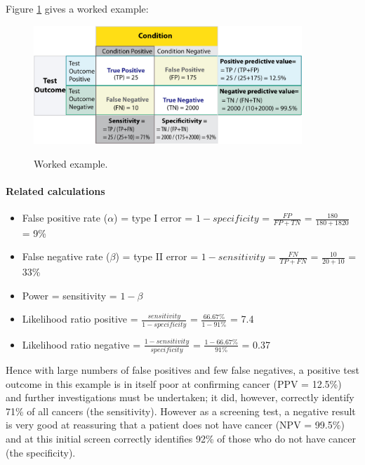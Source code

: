 Figure \ref{fig:sens_spec_example} gives a worked example:

\begin{figure}[ht]
  \centering
  \includegraphics[width=0.9\textwidth]{../Images/Sensitivity_Specificity_Example.jpg}\\
  \caption{Worked example.}\label{fig:sens_spec_example}
\end{figure}

\paragraph{Related calculations}

\begin{itemize}
  \item False positive rate ($\alpha$) = type I error = $1 - specificity$ = $\frac{FP}{FP + TN}$ = $\frac{180}{180+1820}$ = 9\%
  \item False negative rate ($\beta$) = type II error = $1 - sensitivity$ = $\frac{FN}{TP + FN}$ = $\frac{10}{20+10}$ = 33\%
  \item Power = sensitivity = $1 - \beta$
  \item Likelihood ratio positive = $\frac{sensitivity}{1−specificity}$ = $\frac{66.67\%}{1−91\%}$ = 7.4
  \item Likelihood ratio negative = $\frac{1−sensitivity}{specificity}$ = $\frac{1−66.67\%}{91\%}$ = 0.37
\end{itemize}

Hence with large numbers of false positives and few false negatives, a positive test outcome in this example is in itself poor at confirming cancer (PPV = 12.5\%) and further investigations must be undertaken; it did, however, correctly identify 71\% of all cancers (the sensitivity). However as a screening test, a negative result is very good at reassuring that a patient does not have cancer (NPV = 99.5\%) and at this initial screen correctly identifies 92\% of those who do not have cancer (the specificity).

